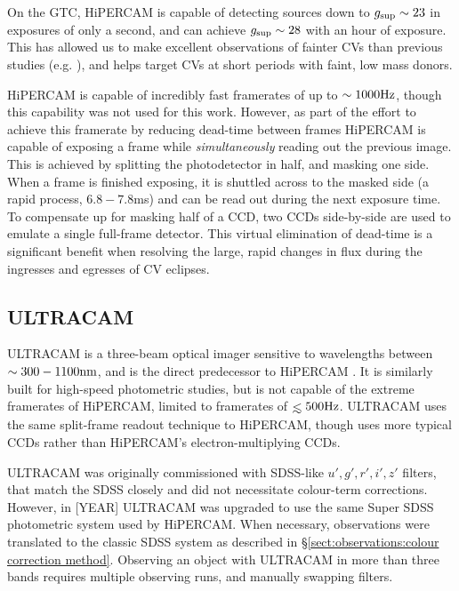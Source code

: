 On the GTC, HiPERCAM is capable of detecting sources down to $g_{\rm sup} \sim 23$ in exposures of only a second, and can achieve $g_{\rm sup} \sim 28$ with an hour of exposure. This has allowed us to make excellent observations of fainter CVs than previous studies (e.g. \citealt{McallisterThesis}), and helps target CVs at short periods with faint, low mass donors. 

HiPERCAM is capable of incredibly fast framerates of up to $\sim 1000 \rm Hz$, though this capability was not used for this work. 
However, as part of the effort to achieve this framerate by reducing dead-time between frames HiPERCAM is capable of exposing a frame while {\it simultaneously} reading out the previous image. 
This is achieved by splitting the photodetector in half, and masking one side. When a frame is finished exposing, it is shuttled across to the masked side (a rapid process, $6.8 - 7.8$ms) and can be read out during the next exposure time. To compensate up for masking half of a CCD, two CCDs side-by-side are used to emulate a single full-frame detector.
This virtual elimination of dead-time is a significant benefit when resolving the large, rapid changes in flux during the ingresses and egresses of CV eclipses.


\subsection{ULTRACAM}
\label{sect:observations:ultracam}

ULTRACAM is a three-beam optical imager sensitive to wavelengths between $\sim 300 - 1100 \rm nm$, and is the direct predecessor to HiPERCAM \citep{dhillon2007}. 
It is similarly built for high-speed photometric studies, but is not capable of the extreme framerates of HiPERCAM, limited to framerates of $\lesssim 500 \rm Hz$. 
ULTRACAM uses the same split-frame readout technique to HiPERCAM, though uses more typical CCDs rather than HiPERCAM's electron-multiplying CCDs. 

ULTRACAM was originally commissioned with SDSS-like $u',g',r',i',z'$ filters, that match the SDSS closely and did not necessitate colour-term corrections. However, in [YEAR]  ULTRACAM was upgraded to use the same Super SDSS photometric system used by HiPERCAM. When necessary, observations were translated to the classic SDSS system as described in \S\ref{sect:observations:colour correction method}. 
Observing an object with ULTRACAM in more than three bands requires multiple observing runs, and manually swapping filters.


